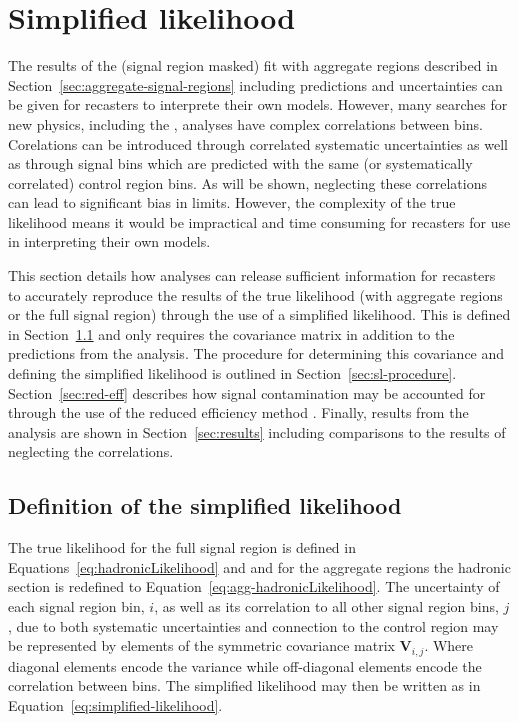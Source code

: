 \section{Simplified likelihood}
\label{sec:simplified-likelihood}

The results of the (signal region masked) fit with aggregate regions described
in Section~\ref{sec:aggregate-signal-regions} including predictions
and uncertainties can be given for recasters to interprete their own
models. However, many searches for new physics, including the \alphat,
analyses have complex correlations between bins. Corelations 
can be introduced through correlated systematic uncertainties as well as 
through signal bins which are predicted with the same (or systematically
correlated) control region bins. As will be shown, neglecting these 
correlations can lead to significant bias in limits. However,
the complexity of the true likelihood means it would be impractical
and time consuming for recasters for use in interpreting their own models.

This section details how analyses can release sufficient information for recasters to 
accurately reproduce the results of the true likelihood (with aggregate regions or
the full signal region) through the use of a simplified likelihood. This is defined
in Section~\ref{sec:sl-definition} and only requires the covariance matrix
in addition to the predictions from the analysis. The procedure for determining
this covariance and defining the simplified likelihood is outlined in Section~\ref{sec:sl-procedure}.
Section~\ref{sec:red-eff} describes how signal contamination may be accounted for
through the use of the reduced efficiency method \cite{redeff}. Finally, results
from the \alphat analysis are shown in Section~\ref{sec:results} including comparisons
to the results of neglecting the correlations.


\subsection{Definition of the simplified likelihood}
\label{sec:sl-definition}
The true likelihood for the full signal region is defined in Equations~\ref{eq:hadronicLikelihood}
and \label{eq:controlLikelihood} and for the aggregate regions the 
hadronic section is redefined to Equation~\ref{eq:agg-hadronicLikelihood}. The uncertainty
of each signal region bin, $i$, as well as its correlation to all other signal region bins, $j$, 
due to both systematic uncertainties and connection to the control region may be represented
by elements of the symmetric covariance matrix $\mathbf{V}_{i,j}$. Where diagonal elements encode the 
variance while off-diagonal elements encode the correlation between bins. The simplified likelihood
may then be written as in Equation~\ref{eq:simplified-likelihood}.

